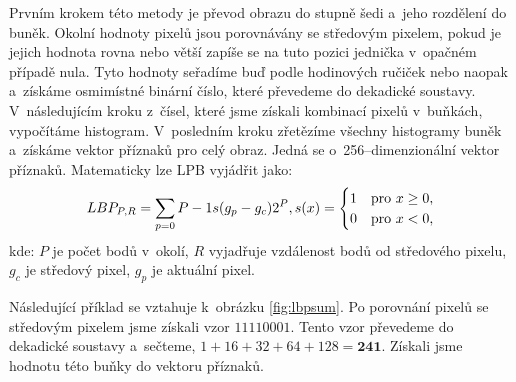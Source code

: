 Prvním krokem této metody je převod obrazu do stupně šedi a~jeho rozdělení do buněk. Okolní hodnoty pixelů jsou porovnávány se středovým pixelem, pokud je jejich hodnota rovna nebo větší zapíše se na tuto pozici jednička v~opačném případě nula. Tyto hodnoty seřadíme buď podle hodinových ručiček nebo naopak a~získáme osmimístné binární číslo, které převedeme do dekadické soustavy. V~následujícím kroku z~čísel, které jsme získali kombinací pixelů v~buňkách, vypočítáme histogram. V~posledním kroku zřetězíme všechny histogramy buněk a~získáme vektor příznaků pro celý obraz. Jedná se o~256--dimenzionální vektor příznaků. 
Matematicky lze LPB vyjádřit jako:
\begin{equation*}
LBP_{P,R} = \sum_{p=0}{P-1} s(g_p - g_c)2^P, \\
s(x) =
  \begin{cases} 
   1 & \text{pro } x \geq 0, \\
   0       & \text{pro } x < 0,
  \end{cases}
\end{equation*}
kde: $P$ je počet bodů v~okolí, $R$ vyjadřuje vzdálenost bodů od středového pixelu, $g_c$ je středový pixel, $g_p$ je aktuální pixel. 

Následující příklad se vztahuje k~obrázku \ref{fig:lbpsum}. Po porovnání pixelů se středovým pixelem jsme získali vzor $11110001$. Tento vzor převedeme do dekadické soustavy a~sečteme, $ 1+16+32+64+128 = \textbf{241}$. Získali jsme hodnotu této buňky do vektoru příznaků.


